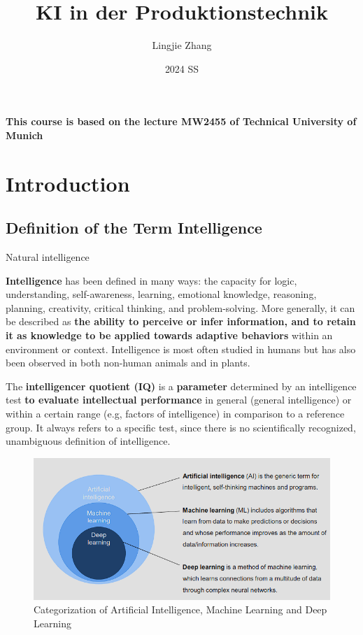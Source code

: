 \documentclass[12pt, a4paper, oneside, justified]{article}
\title{KI in der Produktionstechnik}
\author{Lingjie Zhang}
\date{2024 SS}
\begin{document}
\maketitle

\begin{center}
\textbf{This course is based on the lecture MW2455 of Technical University of Munich}
\end{center}

\tableofcontents
\newpage
{}

\section{Introduction}

\subsection{Definition of the Term Intelligence}

Natural intelligence
\par
\textbf{Intelligence} has been defined in many ways: the capacity for logic, understanding, self-awareness, 
learning, emotional knowledge, reasoning, planning, creativity, critical thinking, and problem-solving. 
More generally, it can be described as \textbf{the ability to perceive or infer information, and to retain it as knowledge to be applied towards adaptive behaviors} 
within an environment or context. Intelligence is most often studied in humans but has also been observed in both non-human animals and in plants.

The \textbf{intelligencer quotient (IQ)} is a \textbf{parameter} determined by an intelligence test 
\textbf{to evaluate intellectual performance} in general (general intelligence) or within a certain range 
(e.g, factors of intelligence) in comparison to a reference group. It always refers to a specific test, 
since there is no scientifically recognized, unambiguous definition of intelligence.

\begin{figure}[htbp]
    \centering
    \includegraphics[scale=1]{../img/1-1.png}
    \caption{Categorization of Artificial Intelligence, Machine Learning and Deep Learning}
    \label{img/1-1}
\end{figure}
\end{document}
